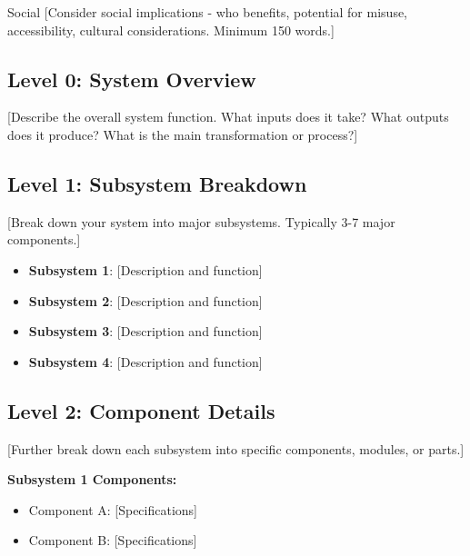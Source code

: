 \documentclass[final]{designreport}
\begin{document}
\begin{impactstatement}{Social}
[Consider social implications - who benefits, potential for misuse, accessibility, cultural considerations. Minimum 150 words.]
\end{impactstatement}

\designsection


\functionaldecomp

\subsection{Level 0: System Overview}
[Describe the overall system function. What inputs does it take? What outputs does it produce? What is the main transformation or process?]


\subsection{Level 1: Subsystem Breakdown}
[Break down your system into major subsystems. Typically 3-7 major components.]

\begin{itemize}
    \item \textbf{Subsystem 1}: [Description and function]
    \item \textbf{Subsystem 2}: [Description and function]  
    \item \textbf{Subsystem 3}: [Description and function]
    \item \textbf{Subsystem 4}: [Description and function]
\end{itemize}

\subsection{Level 2: Component Details}
[Further break down each subsystem into specific components, modules, or parts.]

\textbf{Subsystem 1 Components:}
\begin{itemize}
    \item Component A: [Specifications]
    \item Component B: [Specifications]
\end{itemize}
\end{document}
